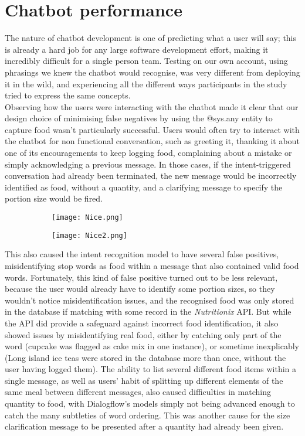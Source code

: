 \section{Chatbot performance}
The nature of chatbot development is one of predicting what a user will say; this is already a hard job for any large software development effort, making it incredibly difficult for a single person team.
Testing on our own account, using phrasings we knew the chatbot would recognise, was very different from deploying it in the wild, and experiencing all the different ways participants in the study tried to express the same concepts. \\
Observing how the users were interacting with the chatbot made it clear that our design choice of minimising false negatives by using the @sys.any entity to capture food wasn't particularly successful. Users would often try to interact with the chatbot for non functional conversation, such as greeting it, thanking it about one of its encouragements to keep logging food, complaining about a mistake or simply acknowledging a previous message. In those cases, if the intent-triggered conversation had already been terminated, the new message would be incorrectly identified as food, without a quantity, and a clarifying message to specify the portion size would be fired. \\
\begin{figure}[h!]
  \centering
  \begin{subfigure}[b]{\linewidth}
    \texttt{[image: Nice.png]}
  \end{subfigure}
  \begin{subfigure}[b]{\linewidth}
    \texttt{[image: Nice2.png]}
  \end{subfigure}
\end{figure}
This also caused the intent recognition model to have several false positives, misidentifying stop words as food within a message that also contained valid food words. Fortunately, this kind of false positive turned out to be less relevant, because the user would already have to identify some portion sizes, so they wouldn't notice misidentification issues, and the recognised food was only stored in the database if matching with some record in the \textit{Nutritionix} API. But while the API did provide a safeguard against incorrect food identification, it also showed issues by misidentifying real food, either by catching only part of the word (cupcake was flagged as cake mix in one instance), or sometime inexplicably (Long island ice teas were stored in the database more than once, without the user having logged them). The ability to list several different food items within a single message, as well as users' habit of splitting up different elements of the same meal between different messages, also caused difficulties in matching quantity to food, with Dialogflow's models simply not being advanced enough to catch the many subtleties of word ordering. This was another cause for the size clarification message to be presented after a quantity had already been given.\\
